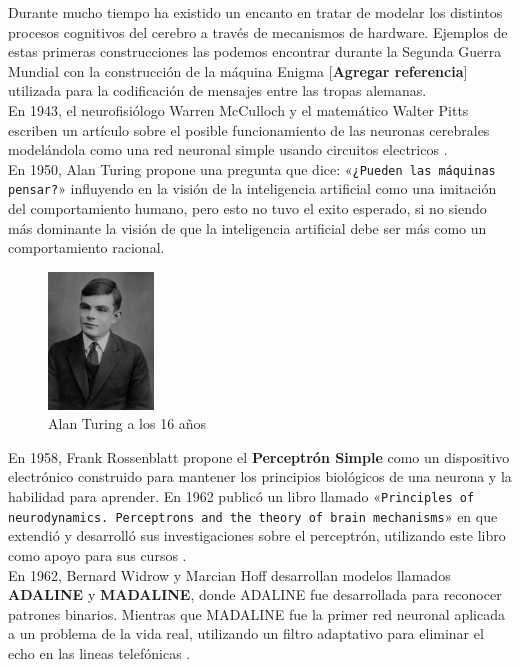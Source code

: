 Durante mucho tiempo ha existido un encanto en tratar de modelar los
distintos procesos cognitivos del cerebro a través de mecanismos de
hardware. Ejemplos de estas primeras construcciones las podemos
encontrar durante la Segunda Guerra Mundial con la construcción de la
máquina Enigma [\textbf{Agregar referencia}] utilizada para la
codificación de mensajes entre las tropas alemanas.\\

En 1943, el neurofisiólogo Warren McCulloch y el matemático Walter
Pitts escriben un artículo sobre el posible funcionamiento de las
neuronas cerebrales modelándola como una red neuronal simple usando
circuitos electricos \cite{mcculloch1943logical}.\\

En 1950, Alan Turing propone una pregunta que dice: «\texttt{¿Pueden
 las máquinas pensar?}» \cite{turing1950computing} influyendo en la
visión de la inteligencia artificial como una imitación del
comportamiento humano, pero esto no tuvo el exito esperado, si no
siendo más dominante la visión de que la inteligencia artificial debe
ser más como un comportamiento racional.\\

\begin{figure}
    \centering
    \includegraphics[width=0.25\textwidth]{Alan_Turing}
    \caption{Alan Turing a los 16 años}
    \label{fig:turing}
\end{figure}

En 1958, Frank Rossenblatt propone el \textbf{Perceptrón Simple}
como un dispositivo electrónico construido para mantener los
principios biológicos de una neurona y la habilidad para aprender. En
1962 publicó un libro llamado «\texttt{Principles of
 neurodynamics. Perceptrons and the theory of brain mechanisms}» en
que extendió y desarrolló sus investigaciones sobre el perceptrón,
utilizando este libro como apoyo para sus cursos \cite{rosenblatt1958perceptron}.\\

En 1962, Bernard Widrow y Marcian Hoff desarrollan modelos llamados
\textbf{ADALINE} y \textbf{MADALINE}, donde ADALINE fue desarrollada
para reconocer patrones binarios. Mientras que MADALINE fue la primer
red neuronal aplicada a un problema de la vida real, utilizando un
filtro adaptativo para eliminar el echo en las lineas telefónicas
\cite{widrow1962associative, widrow1960adaptive}.\\

